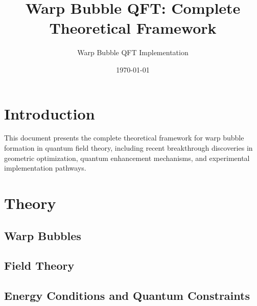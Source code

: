 \documentclass{article}
\title{Warp Bubble QFT: Complete Theoretical Framework}
\author{Warp Bubble QFT Implementation}
\date{\today}
\begin{document}
\maketitle

\tableofcontents
\newpage

\section{Introduction}

This document presents the complete theoretical framework for warp bubble formation in quantum field theory, including recent breakthrough discoveries in geometric optimization, quantum enhancement mechanisms, and experimental implementation pathways.

\section{Theory}

\subsection{Warp Bubbles}







\subsection{Field Theory}





\subsection{Energy Conditions and Quantum Constraints}






\end{document}
